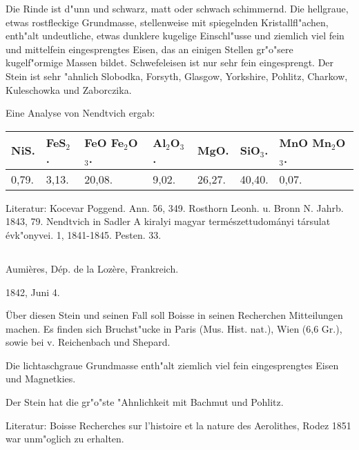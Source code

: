 \documentclass[a4paper, 11pt, oneside]{article}
\begin{document}
Die Rinde ist d"unn und schwarz, matt oder schwach schimmernd. Die hellgraue, etwas rostfleckige Grundmasse, stellenweise mit spiegelnden Kristallfl"achen, enth"alt undeutliche, etwas dunklere kugelige Einschl"usse und ziemlich viel fein und mittelfein eingesprengtes Eisen, das an einigen Stellen gr"o"sere kugelf"ormige Massen bildet. Schwefeleisen ist nur sehr fein eingesprengt. Der Stein ist sehr "ahnlich Slobodka, Forsyth, Glasgow, Yorkshire, Pohlitz, Charkow, Kuleschowka und Zaborczika.

Eine Analyse von Nendtvich ergab:
\begin{table}[!ht]
    \centering\swabfamily\Large
    \normalsize
    \begin{tabular}{l l l l l l l}
        NiS. & FeS$_{2}$. & FeO Fe$_{2}$O$_{3}$. & Al$_{2}$O$_{3}$. & MgO. & SiO$_{3}$. & MnO Mn$_{2}$O$_{3}$. \\ \hline
        0,79. & 3,13. & 20,08. & 9,02. & 26,27. & 40,40. & 0,07. \\
    \end{tabular}
\end{table}

\normalsize
Literatur: Kocevar Poggend. Ann. 56, 349. Rosthorn Leonh. u. Bronn N. Jahrb. 1843, 79. Nendtvich in Sadler A kiralyi magyar természettudományi társulat évk"onyvei. 1, 1841-1845. Pesten. 33.

\subsection{}
\LARGE
\paragraph{}
Aumières, Dép. de la Lozère, Frankreich.

1842, Juni 4.

Über diesen Stein und seinen Fall soll Boisse in seinen Recherchen Mitteilungen machen. Es finden sich Bruchst"ucke in Paris (Mus. Hist. nat.), Wien (6,6 Gr.), sowie bei v. Reichenbach und Shepard.

Die lichtaschgraue Grundmasse enth"alt ziemlich viel fein eingesprengtes Eisen und Magnetkies.

Der Stein hat die gr"o"ste "Ahnlichkeit mit Bachmut und Pohlitz.

\normalsize
Literatur: Boisse Recherches sur l'histoire et la nature des Aerolithes, Rodez 1851 war unm"oglich zu erhalten.

\subsection{}
\LARGE
\end{document}

